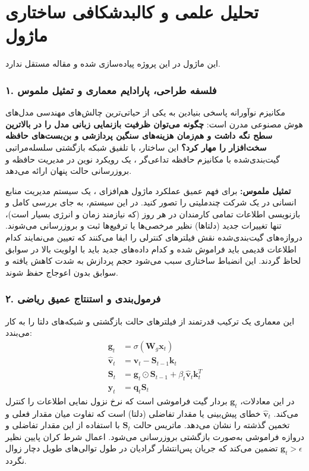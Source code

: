 \section{تحلیل علمی و کالبدشکافی ساختاری ماژول }

این ماژول در این پروژه پیاده‌سازی شده و مقاله مستقل ندارد.
\label{sec:hgrn2_gated_deltanet}

\subsubsection*{۱. فلسفه طراحی، پارادایم معماری و تمثیل ملموس}
مکانیزم نوآورانه  پاسخی بنیادین به یکی از حیاتی‌ترین چالش‌های مهندسی مدل‌های هوش مصنوعی مدرن است: \textbf{چگونه می‌توان ظرفیت بازنمایی زبانی مدل را در بالاترین سطح نگه داشت و هم‌زمان هزینه‌های سنگین پردازشی و بن‌بست‌های حافظه سخت‌افزار را مهار کرد؟} این ساختار، با تلفیق شبکه بازگشتی سلسله‌مراتبی گیت‌بندی‌شده  با مکانیزم حافظه تداعی‌گر ، یک رویکرد نوین در مدیریت حافظه و بروزرسانی حالت پنهان ارائه می‌دهد.

\textbf{تمثیل ملموس:}
برای فهم عمیق عملکرد ماژول هم‌افزای ، یک سیستم مدیریت منابع انسانی در یک شرکت چندملیتی را تصور کنید. در این سیستم، به جای بررسی کامل و بازنویسی اطلاعات تمامی کارمندان در هر روز (که نیازمند زمان و انرژی بسیار است)، تنها تغییرات جدید (دلتاها) نظیر مرخصی‌ها یا ترفیع‌ها ثبت و بروزرسانی می‌شوند. دروازه‌های گیت‌بندی‌شده نقش فیلترهای کنترلی را ایفا می‌کنند که تعیین می‌نمایند کدام اطلاعات قدیمی باید فراموش شده و کدام داده‌های جدید باید با اولویت بالا در سوابق لحاظ گردند. این انضباط ساختاری سبب می‌شود حجم پردازش به شدت کاهش یافته و سوابق بدون اعوجاج حفظ شوند.

\subsubsection*{۲. فرمول‌بندی و استنتاج عمیق ریاضی }
این معماری یک ترکیب قدرتمند از فیلترهای حالت بازگشتی و شبکه‌های دلتا را به کار می‌بندد:
\begin{align}
\mathbf{g}_t &= \sigma(\mathbf{W}_g \mathbf{x}_t) \\
\hat{\mathbf{v}}_t &= \mathbf{v}_t - \mathbf{S}_{t-1}\mathbf{k}_t \\
\mathbf{S}_t &= \mathbf{g}_t \odot \mathbf{S}_{t-1} + \beta_t \hat{\mathbf{v}}_t \mathbf{k}_t^T \\
\mathbf{y}_t &= \mathbf{q}_t \mathbf{S}_t
\end{align}
در این معادلات، $\mathbf{g}_t$ بردار گیت فراموشی است که نرخ نزول نمایی اطلاعات را کنترل می‌کند. $\hat{\mathbf{v}}_t$ خطای پیش‌بینی یا مقدار تفاضلی (دلتا) است که تفاوت میان مقدار فعلی و تخمین گذشته را نشان می‌دهد. ماتریس حالت $\mathbf{S}_t$ با استفاده از این مقدار تفاضلی و دروازه فراموشی به‌صورت بازگشتی بروزرسانی می‌شود. اعمال شرط کران پایین نظیر $\mathbf{g}_t > \epsilon$ تضمین می‌کند که جریان پس‌انتشار گرادیان در طول توالی‌های طویل دچار زوال نگردد.

